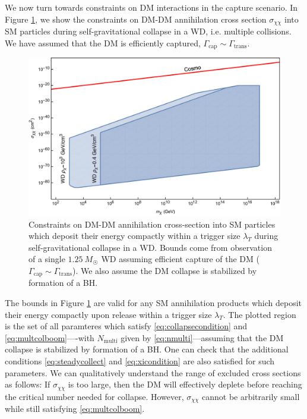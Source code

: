 \documentclass[preprintnumbers,amsmath,amssymb,prd,superscriptaddress]{revtex4}
\begin{document}
We now turn towards constraints on DM interactions in the capture scenario. 
In Figure \ref{fig:multicapture}, we show the constraints on DM-DM annihilation cross section $\sigma_{\chi \chi}$ into SM particles during self-gravitational collapse in a WD, i.e. multiple collisions.
We have assumed that the DM is efficiently captured, $\Gamma_\text{cap} \sim \Gamma_\text{trans}$. 
\begin{figure}
\includegraphics[scale=.35]{multicollision.pdf}
\caption{Constraints on DM-DM annihilation cross-section into SM particles which deposit their energy compactly within a trigger size $\lambda_T$ during self-gravitational collapse in a WD. Bounds come from observation of a single $1.25~M_{\astrosun}$ WD assuming efficient capture of the DM ($\Gamma_\text{cap} \sim \Gamma_\text{trans}$). We also assume the DM collapse is stabilized by formation of a BH.}
\label{fig:multicapture}
\end{figure}
The bounds in Figure \ref{fig:multicapture} are valid for any SM annihilation products which deposit their energy compactly upon release within a trigger size $\lambda_T$.
The plotted region is the set of all paramteres which satisfy \eqref{eq:collapsecondition} and \eqref{eq:multcolboom}----with $N_\text{multi}$ given by \eqref{eq:nmulti}---assuming that the DM collapse is stabilized by formation of a BH. 
One can check that the additional conditions \eqref{eq:steadycollect} and \eqref{eq:xicondition} are also satisfied for such parameters. 
We can qualitatively understand the range of excluded cross sections as follows:
If $\sigma_{\chi \chi}$ is too large, then the DM will effectively deplete before reaching the critical number needed for collapse.
However, $\sigma_{\chi \chi}$ cannot be arbitrarily small while still satisfying \eqref{eq:multcolboom}. 
\end{document}
